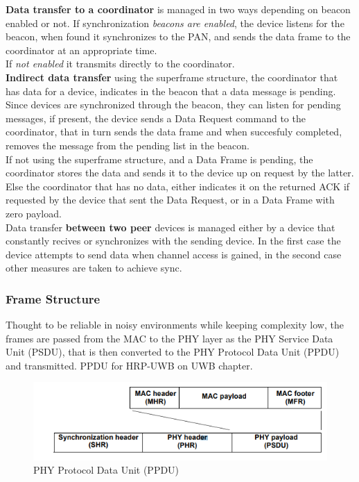 \documentclass[conference]{IEEEtran}
\begin{document}
\textbf{Data transfer to a coordinator} is managed in two ways depending on beacon enabled 
or not. If synchronization \emph{beacons are enabled}, the device listens for the beacon, when found 
it synchronizes to the PAN, and sends the data frame to the coordinator at an appropriate 
time.\\
If \emph{not enabled} it transmits directly to the coordinator.\\

\textbf{Indirect data transfer} using the superframe structure, the coordinator that has data for
a device, indicates in the beacon that a data message is pending. Since devices are
synchronized through the beacon, they can listen for pending messages, if present, the device
sends a Data Request command to the coordinator, that in turn sends the data frame and when
succesfuly completed, removes the message from the pending list in the beacon.\\
If not using the superframe structure, and a Data Frame is pending, the coordinator stores 
the data and sends it to the device up on request by the latter. Else the coordinator that 
has no data, either indicates it on the returned ACK if requested by the device that sent the
Data Request, or in a Data Frame with zero payload.\\ 

Data transfer \textbf{between two peer} devices is managed either by a device that constantly 
recives or synchronizes with the sending device. In the first case the device attempts to 
send data when channel access is gained, in the second case other measures are taken to 
achieve sync.\\

\subsubsection{Frame Structure}
Thought to be reliable in noisy environments while keeping complexity low, the frames are
passed from the MAC to the PHY layer as the PHY Service Data Unit (PSDU), that is then
converted to the PHY Protocol Data Unit (PPDU) and transmitted. PPDU for HRP-UWB 
on UWB chapter.\\

\begin{figure}[!h]
  \centering
  \includegraphics[width=1\linewidth]{PPDU}
  \caption{PHY Protocol Data Unit (PPDU)}
  \label{fig:PPDU}
\end{figure}
\end{document}
